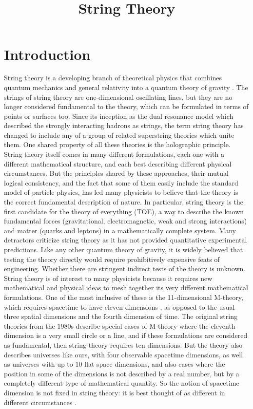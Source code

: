 \documentclass[a4paper]{article}
\begin{document}
\title{String Theory}
\maketitle

\section{Introduction}

String theory is a developing branch of theoretical physics that
combines quantum mechanics and general relativity into a quantum
theory of gravity \cite{Mukhi:1999:introduction}. The strings of
string theory are one-dimensional oscillating lines, but they are no
longer considered fundamental to the theory, which can be formulated
in terms of points or surfaces too. Since its inception as the dual
resonance model which described the strongly interacting hadrons as
strings, the term string theory has changed to include any of a
group of related superstring theories which unite them. One shared
property of all these theories is the holographic principle. String
theory itself comes in many different formulations, each one with a
different mathematical structure, and each best describing different
physical circumstances. But the principles shared by these
approaches, their mutual logical consistency, and the fact that some
of them easily include the standard model of particle physics, has
led many physicists to believe that the theory is the correct
fundamental description of nature. In particular, string theory is
the first candidate for the theory of everything (TOE), a way to
describe the known fundamental forces (gravitational,
electromagnetic, weak and strong interactions) and matter (quarks
and leptons) in a mathematically complete system. Many detractors
criticize string theory as it has not provided quantitative
experimental predictions. Like any other quantum theory of gravity,
it is widely believed that testing the theory directly would require
prohibitively expensive feats of engineering. Whether there are
stringent indirect tests of the theory is unknown. String theory is
of interest to many physicists because it requires new mathematical
and physical ideas to mesh together its very different mathematical
formulations. One of the most inclusive of these is the
11-dimensional M-theory, which requires spacetime to have eleven
dimensions \cite{Duff:1995:origin}, as opposed to the usual three
spatial dimensions and the fourth dimension of time. The original
string theories from the 1980s describe special cases of M-theory
where the eleventh dimension is a very small circle or a line, and
if these formulations are considered as fundamental, then string
theory requires ten dimensions. But the theory also describes
universes like ours, with four observable spacetime dimensions, as
well as universes with up to 10 flat space dimensions, and also
cases where the position in some of the dimensions is not described
by a real number, but by a completely different type of mathematical
quantity. So the notion of spacetime dimension is not fixed in
string theory: it is best thought of as different in different
circumstances \cite{Polchinski:1998:stringtheory}.



\end{document}
